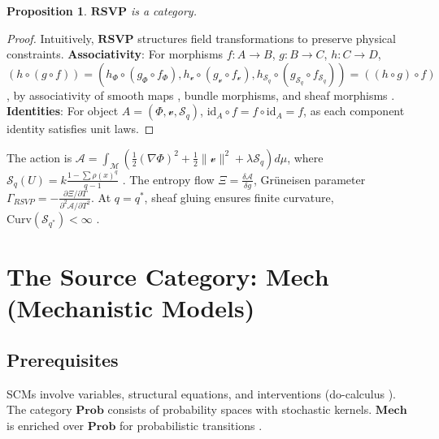 \documentclass{article}
\theoremstyle{plain}
\newtheorem{proposition}[theorem]{Proposition}
\theoremstyle{definition}
\begin{document}
\begin{proposition}
$\mathbf{RSVP}$ is a category.
\end{proposition}
\begin{proof}
Intuitively, $\mathbf{RSVP}$ structures field transformations to preserve physical constraints. \textbf{Associativity}: For morphisms $f: A \to B$, $g: B \to C$, $h: C \to D$, $(h \circ (g \circ f)) = (h_\Phi \circ (g_\Phi \circ f_\Phi), h_\mathcal{v} \circ (g_\mathcal{v} \circ f_\mathcal{v}), h_{\mathcal{S}_q} \circ (g_{\mathcal{S}_q} \circ f_{\mathcal{S}_q})) = ((h \circ g) \circ f)$, by associativity of smooth maps \cite{Kock2004}, bundle morphisms, and sheaf morphisms \cite{MacLane1992}. \textbf{Identities}: For object $A = (\Phi, \mathcal{v}, \mathcal{S}_q)$, $\text{id}_A \circ f = f \circ \text{id}_A = f$, as each component identity satisfies unit laws.
\end{proof}

The action is $\mathcal{A} = \int_{\mathcal{M}} \left( \frac{1}{2}(\nabla \Phi)^2 + \frac{1}{2}\|\mathcal{v}\|^2 + \lambda \mathcal{S}_q \right) d\mu$, where $\mathcal{S}_q(U) = k \frac{1 - \sum \rho(x)^q}{q-1}$ \cite{Tsallis1988}. The entropy flow $\Xi = \frac{\delta \mathcal{A}}{\delta g}$, Gr\"uneisen parameter $\Gamma_{RSVP} = - \frac{\partial \Xi / \partial T}{\partial^2 \mathcal{A} / \partial T^2}$. At $q = q^*$, sheaf gluing ensures finite curvature, $\text{Curv}(\mathcal{S}_{q^*}) < \infty$ \cite{Soares2024}.

\section{The Source Category: $\mathbf{Mech}$ (Mechanistic Models)}

\subsection{Prerequisites}
SCMs involve variables, structural equations, and interventions (do-calculus \cite{Pearl2009}). The category $\mathbf{Prob}$ consists of probability spaces with stochastic kernels. $\mathbf{Mech}$ is enriched over $\mathbf{Prob}$ for probabilistic transitions \cite{Lawvere2009}.
\end{document}
